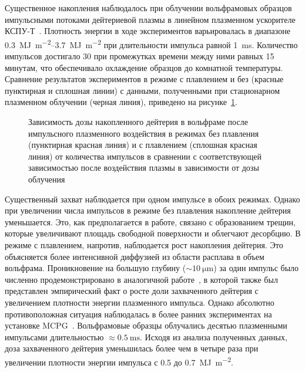 Существенное накопления наблюдалось при облучении вольфрамовых образцов импульсными потоками дейтериевой плазмы в линейном плазменном ускорителе КСПУ-Т~\cite{Ogorodnikova}. Плотность энергии в ходе экспериментов варьировалась в диапазоне \SIrange{0.3}{3.7}{\mega\joule\per\meter\squared} при длительности импульса равной \SI{1}{\milli\second}. Количество импульсов достигало 30 при промежутках времени между ними равных 15 минутам, что обеспечивало охлаждение образцов до комнатной температуры. Сравнение результатов экспериментов в режиме с плавлением и без (красные пунктирная и сплошная линии) с данными, полученными при стационарном плазменном облучении (черная линия), приведено на рисунке~\cref{fig:ch1/retention_QSPA}. 
\begin{figure}[ht]
    \caption{Зависимость дозы накопленного дейтерия в вольфраме после импульсного плазменного воздействия в режимах без плавления (пунктирная красная линия) и с плавлением (сплошная красная линия) от количества импульсов в сравнении с соответствующей зависимостью после воздействия плазмы в зависимости от дозы облучения~\cite{Ogorodnikova}}\label{fig:ch1/retention_QSPA}
\end{figure}
Существенный захват наблюдается при одном импульсе в обоих режимах. Однако при увеличении числа импульсов в режиме без плавления накопление дейтерия уменьшается. Это, как предполагается в работе, связано с образованием трещин, которые увеличивают площадь свободной поверхности и облегчают десорбцию. В режиме с плавлением, напротив, наблюдается рост накопления дейтерия. Это объясняется более интенсивной диффузией из области расплава в объем вольфрама. Проникновение на большую глубину (\( \sim \SI{10}{\micro\meter} \)) за один импульс было численно продемонстрировано в аналогичной работе~\cite{Poskakalov2020}, в которой также был представлен эмпирический факт о росте доли захваченного дейтерия с увеличением плотности энергии плазменного импульса. Однако абсолютно противоположная ситуация наблюдалась в более ранних экспериментах на установке MCPG~\cite{Nishijima2011}. Вольфрамовые образцы облучались десятью плазменными импульсами длительностью \( \approx\SI{0.5}{\milli\second} \). Исходя из анализа полученных данных, доза захваченного дейтерия уменьшилась более чем в четыре раза при увеличении плотности энергии импульса с \num{0.5} до \SI{0.7}{\mega\joule\per\meter\squared}.

